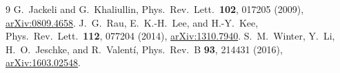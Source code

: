 \documentclass[11pt,oneside]{memoir}
\begin{document}
\begin{thebibliography}{9}
 G.~Jackeli and G.~Khaliullin, Phys.\ Rev.\ Lett.\ \textbf{102}, 017205 (2009), \href{https://arxiv.org/abs/0809.4658}{arXiv:0809.4658}.
 J.~G.~Rau, E.~K.-H.~Lee, and H.-Y.~Kee, Phys.\ Rev.\ Lett.\ \textbf{112}, 077204 (2014), \href{https://arxiv.org/abs/1310.7940}{arXiv:1310.7940}.
 S.~M.~Winter, Y.~Li, H.~O.~Jeschke, and R.~Valent\'i, Phys.\ Rev.\ B \textbf{93}, 214431 (2016), \href{https://arxiv.org/abs/1603.02548}{arXiv:1603.02548}.
\end{thebibliography}
\end{document}
